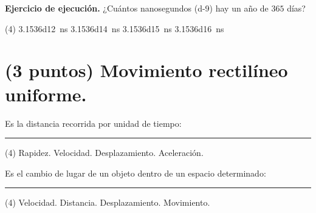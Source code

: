 \documentclass[12pt, letter]{exam}
\begin{document}
\begin{questions}
    \question \label{Ejercicio_01} \textbf{Ejercicio de ejecución.} ¿Cuántos nanosegundos (\num{d-9}) hay un año de $365$ días?
    \begin{tasks}(4)
        \task \SI{3.1536d12}{\nano\second}
        \task \SI{3.1536d14}{\nano\second}
        \task \SI{3.1536d15}{\nano\second}
        \task \SI{3.1536d16}{\nano\second}
    \end{tasks}

    \section{(3 puntos) Movimiento rectilíneo uniforme.}

    \question Es la distancia recorrida por unidad de tiempo: \rule{2cm}{0.1mm} 
    \begin{tasks}(4)
        \task Rapidez.
        \task Velocidad.
        \task Desplazamiento.
        \task Aceleración.
    \end{tasks} 
    \question Es el cambio de lugar de un objeto dentro de un espacio determinado: \rule{2cm}{0.1mm} 
    \begin{tasks}(4)
        \task Velocidad.
        \task Distancia.
        \task Desplazamiento.
        \task Movimiento.
    \end{tasks}


\end{questions}
\end{document}
